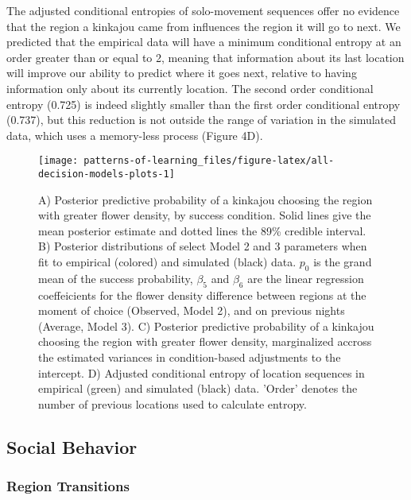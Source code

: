 \documentclass[twoside,12pt,final]{ucthesis-CA2012}
\begin{document}
\begin{ucmainmatter}
The adjusted conditional entropies of solo-movement sequences offer no evidence that the region a kinkajou came from influences the region it will go to next. We predicted that the empirical data will have a minimum conditional entropy at an order greater than or equal to 2, meaning that information about its last location will improve our ability to predict where it goes next, relative to having information only about its currently location. The second order conditional entropy (0.725) is indeed slightly smaller than the first order conditional entropy (0.737), but this reduction is not outside the range of variation in the simulated data, which uses a memory-less process (Figure 4D).
\begin{figure}
\texttt{[image: patterns-of-learning\_files/figure-latex/all-decision-models-plots-1]} \caption[Influence of memory on kinkajou decisions]{A) Posterior predictive probability of a kinkajou choosing the region with greater flower density, by success condition. Solid lines give the mean posterior estimate and dotted lines the 89\% credible interval. B) Posterior distributions of select Model 2 and 3 parameters when fit to empirical (colored) and simulated (black) data. $p_0$ is the grand mean of the success probability, $\beta_5$ and $\beta_6$ are the linear regression coeffeicients for the flower density difference between regions at the moment of choice (Observed, Model 2),  and on previous nights (Average, Model 3). C) Posterior predictive probability of a kinkajou choosing the region with greater flower density, marginalized accross the estimated variances in condition-based adjustments to the intercept. D) Adjusted conditional entropy of location sequences in empirical (green) and simulated (black) data. 'Order' denotes the number of previous locations used to calculate entropy.}\label{fig:all-decision-models-plots}
\end{figure}
\hypertarget{social-behavior-1}{%
\subsection{Social Behavior}\label{social-behavior-1}}

\hypertarget{region-transitions}{%
\subsubsection{Region Transitions}\label{region-transitions}}


\end{ucmainmatter}
\end{document}
